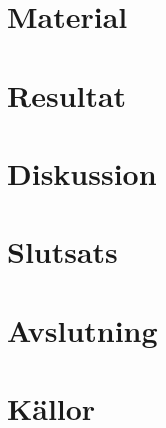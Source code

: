 \documentclass[a4paper]{article}
\begin{document}
\section{Material}

\section{Resultat}

\section{Diskussion}

\section{Slutsats}

\section{Avslutning}

\section{Källor}
\end{document}
